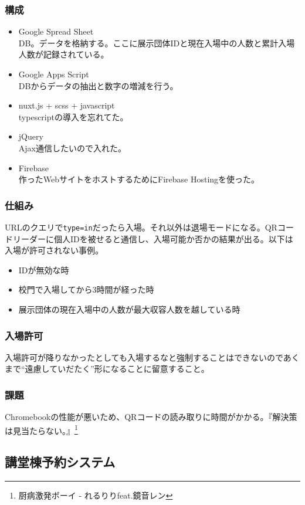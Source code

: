 \documentclass[dvipdfmx,jb5]{jarticle}
\begin{document}
\subsubsection{構成}
\begin{itemize}
  \item Google Spread Sheet\\
  DB。データを格納する。ここに展示団体IDと現在入場中の人数と累計入場人数が記録されている。
   \item Google Apps Script\\
   DBからデータの抽出と数字の増減を行う。
   \item nuxt.js + scss + javascript\\
   typescriptの導入を忘れてた。
   \item jQuery\\
   Ajax通信したいので入れた。
   \item Firebase\\
   作ったWebサイトをホストするためにFirebase Hostingを使った。
  \end{itemize}

\subsubsection{仕組み}
URLのクエリで\verb|type=in|だったら入場。それ以外は退場モードになる。QRコードリーダーに個人IDを被せると通信し、入場可能か否かの結果が出る。以下は入場が許可されない事例。
\begin{itemize}
\item IDが無効な時
\item 校門で入場してから3時間が経った時
\item 展示団体の現在入場中の人数が最大収容人数を越している時
\end{itemize}

\subsubsection{入場許可}
入場許可が降りなかったとしても入場するなと強制することはできないのであくまで``遠慮していだたく''形になることに留意すること。

\subsubsection{課題}
Chromebookの性能が悪いため、QRコードの読み取りに時間がかかる。『解決策は見当たらない。』\footnote{厨病激発ボーイ - れるりりfeat.鏡音レン}

\subsection{講堂棟予約システム}
\end{document}
